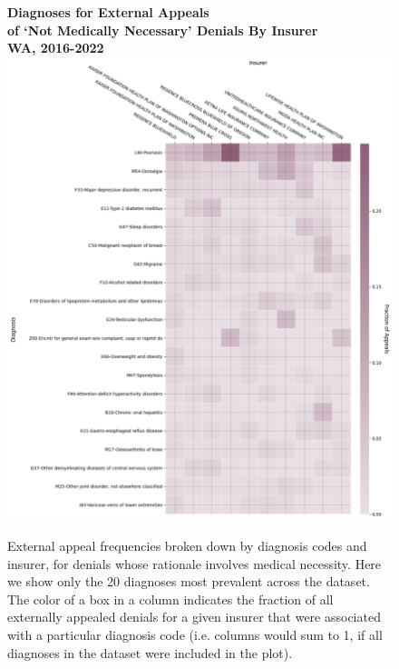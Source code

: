 \documentclass[12pt, a4paper,twoside,parskip=full]{report}
\theoremstyle{plain} %
\theoremstyle{definition} %
\theoremstyle{remark} %
\numberwithin{equation}{chapter}
\begin{document}
		\begin{figure}[h!]
			\centering
			\textbf{Diagnoses for External Appeals}\\
			\textbf{of `Not Medically Necessary' Denials By Insurer}\\ 
			\textbf{WA, 2016-2022}\\
			\includegraphics[width=.8\textwidth]{images/wa_external_appeals/nmn_diagnosis_by_insurer.png}
			\caption{External appeal frequencies broken down by diagnosis codes and insurer, for denials whose rationale involves medical necessity. Here we show only the 20 diagnoses most prevalent across the dataset. The color of a box in a column indicates the fraction of all externally appealed denials for a given insurer that were associated with a particular diagnosis code (i.e. columns would sum to 1, if all diagnoses in the dataset were included in the plot).}
			\label{wanmnexternalappealsbydiagnosisinsurer}
		\end{figure}
	\clearpage
		
\end{document}
